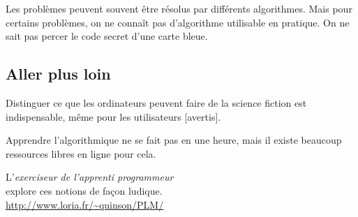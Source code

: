 \documentclass[a7paper,pagesize,DIV=14,10pt]{scrbook}
\begin{document}
Les problèmes peuvent souvent être résolus par différents algorithmes.
Mais pour certains problèmes, on ne connaît pas d'algorithme
utilisable en pratique. On ne sait pas percer le code secret d'une
carte bleue.

\vspace{-.5\baselineskip} %
\subsection*{Aller plus loin}
\vspace{-.5\baselineskip} %
Distinguer ce que les ordinateurs peuvent faire de la science fiction
est indispensable, même pour les utilisateurs [avertis].

Apprendre l'algorithmique ne se fait pas en une heure, mais il existe
beaucoup ressources libres en ligne pour cela.

L'\textit{exerciseur de l'apprenti programmeur}\\ explore
ces notions de façon ludique.\\
{\small\color{blue}\url{http://www.loria.fr/~quinson/PLM/}}
\end{document}
